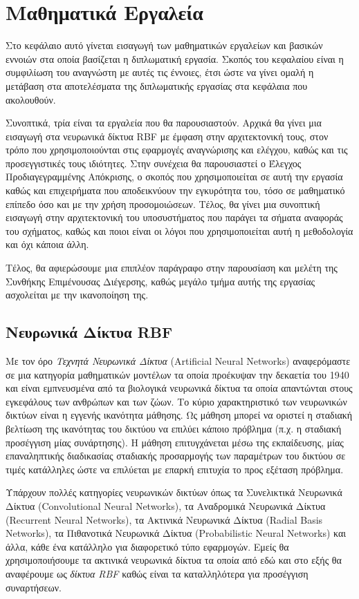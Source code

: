 \chapter{Μαθηματικά Εργαλεία} \label{chap:mathematical_tools}

Στο κεφάλαιο αυτό γίνεται εισαγωγή των μαθηματικών εργαλείων και βασικών εννοιών στα οποία βασίζεται η διπλωματική εργασία. Σκοπός του κεφαλαίου είναι η συμφιλίωση του αναγνώστη με αυτές τις έννοιες, έτσι ώστε να γίνει ομαλή η μετάβαση στα αποτελέσματα της διπλωματικής εργασίας στα κεφάλαια που ακολουθούν. 

Συνοπτικά, τρία είναι τα εργαλεία που θα παρουσιαστούν. Αρχικά θα γίνει μια εισαγωγή στα νευρωνικά δίκτυα RBF με έμφαση στην αρχιτεκτονική τους, στον τρόπο που χρησιμοποιούνται στις εφαρμογές αναγνώρισης και ελέγχου, καθώς και τις προσεγγιστικές τους ιδιότητες. Στην συνέχεια θα παρουσιαστεί ο Έλεγχος Προδιαγεγραμμένης Απόκρισης, ο σκοπός που χρησιμοποιείται σε αυτή την εργασία καθώς και επιχειρήματα που αποδεικνύουν την εγκυρότητα του, τόσο σε μαθηματικό επίπεδο όσο και με την χρήση προσομοιώσεων. Τέλος, θα γίνει μια συνοπτική εισαγωγή στην αρχιτεκτονική του υποσυστήματος που παράγει τα σήματα αναφοράς του σχήματος, καθώς και ποιοι είναι οι λόγοι που χρησιμοποιείται αυτή η μεθοδολογία και όχι κάποια άλλη.

Τέλος, θα αφιερώσουμε μια επιπλέον παράγραφο στην παρουσίαση και μελέτη της Συνθήκης Επιμένουσας Διέγερσης, καθώς μεγάλο τμήμα αυτής της εργασίας ασχολείται με την ικανοποίηση της.

\section{Νευρωνικά Δίκτυα RBF}
\label{sec:rbf_networks}
Με τον όρο \textit{Tεχνητά Νευρωνικά Δίκτυα} (Artificial Neural Networks) αναφερόμαστε σε μια κατηγορία μαθηματικών μοντέλων τα οποία προέκυψαν την δεκαετία του 1940 και είναι εμπνευσμένα από τα βιολογικά νευρωνικά δίκτυα τα οποία απαντώνται στους εγκεφάλους των ανθρώπων και των ζώων. Το κύριο χαρακτηριστικό των νευρωνικών δικτύων είναι η εγγενής ικανότητα μάθησης. Ως μάθηση μπορεί να οριστεί η σταδιακή βελτίωση της ικανότητας του δικτύου να επιλύει κάποιο πρόβλημα (π.χ. η σταδιακή προσέγγιση μίας συνάρτησης). Η μάθηση επιτυγχάνεται μέσω της εκπαίδευσης, μίας επαναληπτικής διαδικασίας σταδιακής προσαρμογής των παραμέτρων του δικτύου σε τιμές κατάλληλες ώστε να επιλύεται με επαρκή επιτυχία το προς εξέταση πρόβλημα.


Υπάρχουν πολλές κατηγορίες νευρωνικών δικτύων όπως τα Συνελικτικά Νευρωνικά Δίκτυα (Convolutional Neural Networks), τα Αναδρομικά Νευρωνικά Δίκτυα (Recurrent Neural Networks), τα Ακτινικά Νευρωνικά Δίκτυα (Radial Basis Networks), τα Πιθανοτικά Νευρωνικά Δίκτυα (Probabilistic Neural Networks) και άλλα, κάθε ένα κατάλληλο για διαφορετικό τύπο εφαρμογών. Εμείς θα χρησιμοποιήσουμε τα ακτινικά νευρωνικά δίκτυα τα οποία από εδώ και στο εξής θα αναφέρουμε ως \textit{δίκτυα RBF} καθώς είναι τα καταλληλότερα για προσέγγιση συναρτήσεων.

